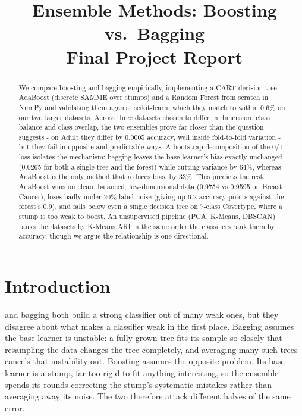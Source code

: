 \documentclass[conference]{IEEEtran}
\title{Ensemble Methods: Boosting vs.\ Bagging\\ {\large Final Project Report}}
\author{
\IEEEauthorblockN{Nadir Askarov}
\IEEEauthorblockA{AI Academy, National AI Center\\
Spring 2026\\
nadir.eskerov25@aiacademy.az}
}
\begin{document}
\maketitle

\begin{abstract}
We compare boosting and bagging empirically, implementing a CART decision
tree, AdaBoost (discrete SAMME over stumps) and a Random Forest from
scratch in NumPy and validating them against scikit-learn, which they match
to within 0.6\% on our two larger datasets.  Across three datasets chosen
to differ in dimension, class balance and class overlap, the two ensembles
prove far closer than the question suggests - on Adult they differ by
0.0005 accuracy, well inside fold-to-fold variation - but they fail in
opposite and predictable ways.  A bootstrap decomposition of the 0/1 loss
isolates the mechanism: bagging leaves the base learner's bias exactly
unchanged (0.0265 for both a single tree and the forest) while cutting
variance by 64\%, whereas AdaBoost is the only method that reduces bias, by
33\%.  This predicts the rest.  AdaBoost wins on clean, balanced,
low-dimensional data (0.9754 vs 0.9595 on Breast Cancer), loses badly under
20\% label noise (giving up 6.2 accuracy points against the forest's 0.9),
and falls below even a single decision tree on 7-class Covertype, where a
stump is too weak to boost.  An unsupervised pipeline (PCA, K-Means,
DBSCAN) ranks the datasets by K-Means ARI in the same order the classifiers
rank them by accuracy, though we argue the relationship is one-directional.
\end{abstract}

\section{Introduction}
\label{sec:intro}
 and bagging both build a strong classifier out
of many weak ones, but they disagree about what makes a classifier weak in
the first place.  Bagging assumes the base learner is unstable: a fully
grown tree fits its sample so closely that resampling the data changes the
tree completely, and averaging many such trees cancels that instability
out.  Boosting assumes the opposite problem.  Its base learner is a stump,
far too rigid to fit anything interesting, so the ensemble spends its
rounds correcting the stump's systematic mistakes rather than averaging
away its noise.  The two therefore attack different halves of the same
error.
\end{document}
